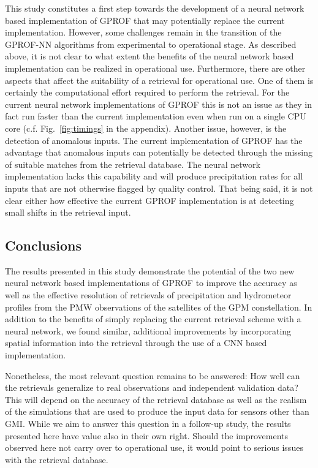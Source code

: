 \documentclass[a4paper,11pt,bibtotoc]{scrartcl}
\begin{document}
This study constitutes a first step towards the development of a neural network
based implementation of GPROF that may potentially replace the current
implementation. However, some challenges remain in the transition of the
GPROF-NN algorithms from experimental to operational stage. As described above,
it is not clear to what extent the benefits of the neural network based
implementation can be realized in operational use. Furthermore, there are other
aspects that affect the suitability of a retrieval for operational use. One of
them is certainly the computational effort required to perform the retrieval.
For the current neural network implementations of GPROF this is not an issue as
they in fact run faster than the current implementation even when run on a
single CPU core (c.f. Fig.~\ref{fig:timings} in the appendix). Another issue,
however, is the detection of anomalous inputs. The current implementation of
GPROF has the advantage that anomalous inputs can potentially be detected
through the missing of suitable matches from the retrieval database. The neural
network implementation lacks this capability and will produce precipitation
rates for all inputs that are not otherwise flagged by quality control. That
being said, it is not clear either how effective the current GPROF
implementation is at detecting small shifts in the retrieval input.


\subsection{Conclusions}

The results presented in this study demonstrate the potential of the two new
neural network based implementations of GPROF to improve the accuracy as well as
the effective resolution of retrievals of precipitation and hydrometeor profiles
from the PMW observations of the satellites of the GPM constellation. In
addition to the benefits of simply replacing the current retrieval scheme with a
neural network, we found similar, additional improvements by incorporating
spatial information into the retrieval through the use of a CNN based
implementation.

Nonetheless, the most relevant question remains to be answered: How well can the
retrievals generalize to real observations and independent validation data? This
will depend on the accuracy of the retrieval database as well as the realism of
the simulations that are used to produce the input data for sensors other than
GMI. While we aim to answer this question in a follow-up study, the results
presented here have value also in their own right. Should the improvements
observed here not carry over to operational use, it would point to serious
issues with the retrieval database.
\end{document}
